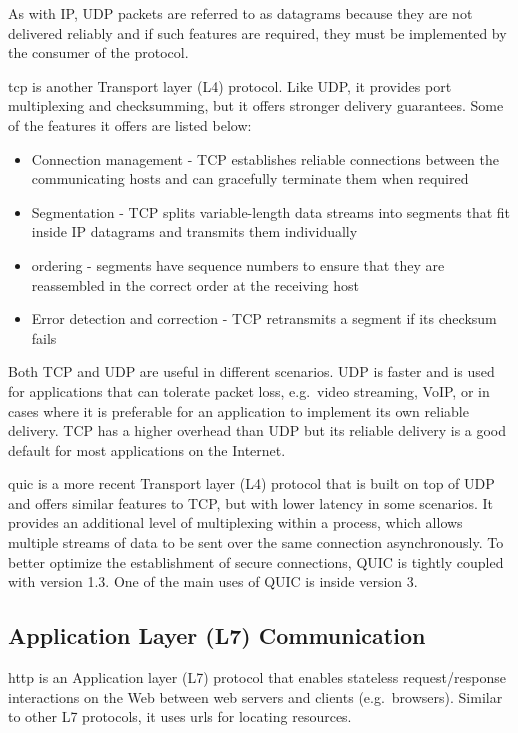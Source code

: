 As with IP, UDP packets are referred to as datagrams because they are
not delivered reliably and if such features are required, they must be
implemented by the consumer of the protocol.

\gls{tcp} is another Transport layer (L4) protocol. Like UDP, it
provides port multiplexing and checksumming, but it offers stronger
delivery guarantees. Some of the features it offers are listed below:

\begin{itemize}
\tightlist
\item
  Connection management - TCP establishes reliable connections between
  the communicating hosts and can gracefully terminate them when
  required
\item
  Segmentation - TCP splits variable-length data streams into segments
  that fit inside IP datagrams and transmits them individually
\item
  ordering - segments have sequence numbers to ensure that they are
  reassembled in the correct order at the receiving host
\item
  Error detection and correction - TCP retransmits a segment if its
  checksum fails
\end{itemize}

Both TCP and UDP are useful in different scenarios. UDP is faster and is
used for applications that can tolerate packet loss, e.g.~video
streaming, VoIP, or in cases where it is preferable for an application
to implement its own reliable delivery. TCP has a higher overhead than
UDP but its reliable delivery is a good default for most applications on
the Internet.

\gls{quic} is a more recent Transport layer (L4) protocol that is built
on top of UDP and offers similar features to TCP, but with lower latency
in some scenarios. It provides an additional level of multiplexing
within a process, which allows multiple streams of data to be sent over
the same connection asynchronously. To better optimize the establishment
of secure connections, QUIC is tightly coupled with  version
1.3. One of the main uses of QUIC is inside  version 3.

\hypertarget{application-layer-l7-communication}{%
\subsection{Application Layer (L7)
Communication}\label{application-layer-l7-communication}}

\gls{http} is an Application layer (L7) protocol that enables stateless
request/response interactions on the Web between web servers and clients
(e.g.~browsers). Similar to other L7 protocols, it uses \glspl{url} for
locating resources.

